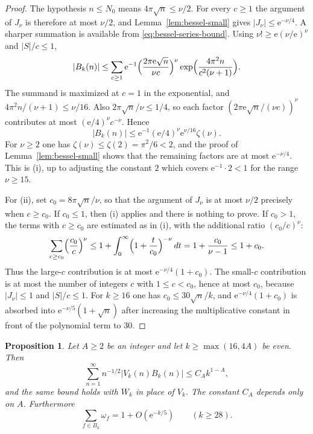 \documentclass[11pt]{amsart}
\newtheorem{proposition}[theorem]{Proposition}
\theoremstyle{definition}
\theoremstyle{remark}
\numberwithin{equation}{section}
\newcommand{\ee}{\mathrm{e}}
\begin{document}
\begin{proof}
The hypothesis $n\le N_0$ means $4\pi\sqrt n\le\nu/2$. For every $c\ge 1$ the argument of $J_\nu$ is therefore at most $\nu/2$, and Lemma~\ref{lem:bessel-small} gives $\lvert J_\nu\rvert\le\ee^{-\nu/4}$. A sharper summation is available from \eqref{eq:bessel-series-bound}. Using $\nu!\ge\ee(\nu/\ee)^\nu$ and $\lvert S\rvert/c\le 1$,
\[
\lvert B_k(n)\rvert
\le\sum_{c\ge 1}\ee^{-1}\Bigl(\frac{2\pi\ee\sqrt n}{\nu c}\Bigr)^\nu
\exp\Bigl(\frac{4\pi^2 n}{c^2(\nu+1)}\Bigr).
\]
The summand is maximized at $c=1$ in the exponential, and $4\pi^2 n/(\nu+1)\le\nu/16$. Also $2\pi\sqrt n/\nu\le 1/4$, so each factor $(2\pi\ee\sqrt n/(\nu c))^\nu$ contributes at most $(\ee/4)^\nu c^{-\nu}$. Hence
\[
\lvert B_k(n)\rvert
\le\ee^{-1}(\ee/4)^\nu\ee^{\nu/16}\zeta(\nu).
\]
For $\nu\ge 2$ one has $\zeta(\nu)\le\zeta(2)=\pi^2/6<2$, and the proof of Lemma~\ref{lem:bessel-small} shows that the remaining factors are at most $\ee^{-\nu/4}$. This is (i), up to adjusting the constant $2$ which covers $\ee^{-1}\cdot 2<1$ for the range $\nu\ge 15$.

For (ii), set $c_0=8\pi\sqrt n/\nu$, so that the argument of $J_\nu$ is at most $\nu/2$ precisely when $c\ge c_0$. If $c_0\le 1$, then (i) applies and there is nothing to prove. If $c_0>1$, the terms with $c\ge c_0$ are estimated as in (i), with the additional ratio $(c_0/c)^\nu$:
\[
\sum_{c\ge c_0}\Bigl(\frac{c_0}{c}\Bigr)^\nu
\le 1+\int_0^\infty\Bigl(1+\frac{t}{c_0}\Bigr)^{-\nu}\,dt
=1+\frac{c_0}{\nu-1}\le 1+c_0.
\]
Thus the large-$c$ contribution is at most $\ee^{-\nu/4}(1+c_0)$. The small-$c$ contribution is at most the number of integers $c$ with $1\le c<c_0$, hence at most $c_0$, because $\lvert J_\nu\rvert\le 1$ and $\lvert S\rvert/c\le 1$. For $k\ge 16$ one has $c_0\le 30\sqrt n/k$, and $\ee^{-\nu/4}(1+c_0)$ is absorbed into $\ee^{-\nu/5}(1+\sqrt n)$ after increasing the multiplicative constant in front of the polynomial term to $30$.
\end{proof}

\begin{proposition}\label{prop:off-diagonal}
Let $A\ge 2$ be an integer and let $k\ge\max(16,4A)$ be even. Then
\begin{equation}\label{eq:off-V}
\sum_{n=1}^\infty n^{-1/2}\lvert V_k(n)B_k(n)\rvert
\le C_A k^{1-A},
\end{equation}
and the same bound holds with $W_k$ in place of $V_k$. The constant $C_A$ depends only on $A$. Furthermore
\[
\sum_{f\in B_k}\omega_f=1+O(\ee^{-k/5})\qquad(k\ge 28).
\]
\end{proposition}
\end{document}
